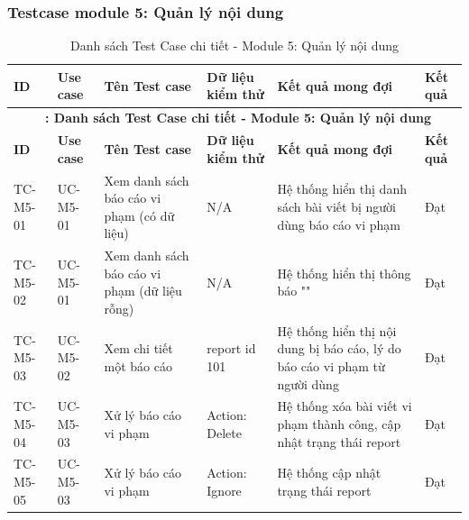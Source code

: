 \subsubsection{Testcase module 5: Quản lý nội dung}

\hypertarget{target:tc_m5}{}
\begin{landscape}
\small 
\begin{longtable}{|p{2.2cm}|p{2.2cm}|p{4cm}|p{4.5cm}|p{6cm}|p{2cm}|}
    
\caption{Danh sách Test Case chi tiết - Module 5: Quản lý nội dung} \label{tab:tc_module5} \\
\hline
\textbf{ID} & \textbf{ Use case} & \textbf{Tên Test case} & \textbf{Dữ liệu kiểm thử} & \textbf{Kết quả mong đợi} & \textbf{Kết quả } \\
\hline
\endfirsthead

\multicolumn{6}{c}{{\bfseries \tablename\ \thetable{}: Danh sách Test Case chi tiết - Module 5: Quản lý nội dung}} \\
\hline
\textbf{ID} & \textbf{ Use case} & \textbf{Tên Test case} & \textbf{Dữ liệu kiểm thử} & \textbf{Kết quả mong đợi} & \textbf{Kết quả } \\
\hline
\endhead

\hline
\endlastfoot


TC-M5-01 & UC-M5-01 & Xem danh sách báo cáo vi phạm (có dữ liệu) & 
N/A & 
Hệ thống hiển thị danh sách bài viết bị người dùng báo cáo vi phạm & Đạt\\
\hline

TC-M5-02 & UC-M5-01 & Xem danh sách báo cáo vi phạm (dữ liệu rỗng) & N/A & 
Hệ thống hiển thị thông báo "" & Đạt \\
\hline

TC-M5-03 & UC-M5-02 & Xem chi tiết một báo cáo & report id 101 & 
Hệ thống hiển thị nội dung bị báo cáo, lý do báo cáo vi phạm từ người dùng & Đạt\\
\hline

TC-M5-04 & UC-M5-03 & Xử lý báo cáo vi phạm & 
Action: Delete    & 
Hệ thống xóa bài viết vi phạm thành công, cập nhật trạng thái report & Đạt \\
\hline

TC-M5-05 & UC-M5-03 & Xử lý báo cáo vi phạm & 
Action: Ignore & 
Hệ thống cập nhật trạng thái report & Đạt \\
\hline


\end{longtable}
\end{landscape}
